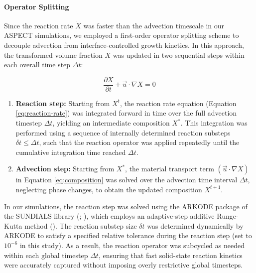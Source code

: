 \documentclass[
  paper=a4,
  ,captions=tableheading
]{scrartcl}
\providecommand{\tightlist}{%
  \setlength{\itemsep}{0pt}\setlength{\parskip}{0pt}}
\begin{document}
\paragraph{Operator Splitting}\label{sec:operator-splitting}

Since the reaction rate \(\dot{X}\) was faster than the advection
timescale in our ASPECT simulations, we employed a first-order operator
splitting scheme to decouple advection from interface-controlled growth
kinetics. In this approach, the transformed volume fraction \(X\) was
updated in two sequential steps within each overall time step
\(\Delta t\):

\begin{equation}
  \frac{\partial X}{\partial t} + \vec{u} \cdot \nabla X = 0
  \label{eq:composition}
\end{equation}

\begin{enumerate}
\def\labelenumi{\arabic{enumi}.}
\tightlist
\item
  \textbf{Reaction step:} Starting from \(X^{t}\), the reaction rate
  equation (Equation \ref{eq:reaction-rate}) was integrated forward in
  time over the full advection timestep \(\Delta t\), yielding an
  intermediate composition \(X^{\ast}\). This integration was performed
  using a sequence of internally determined reaction substeps
  \(\delta t \le \Delta t\), such that the reaction operator was applied
  repeatedly until the cumulative integration time reached \(\Delta t\).
\item
  \textbf{Advection step:} Starting from \(X^{\ast}\), the material
  transport term \(\left(\vec{u} \cdot \nabla X \right)\) in Equation
  \ref{eq:composition} was solved over the advection time interval
  \(\Delta t\), neglecting phase changes, to obtain the updated
  composition \(X^{t+1}\).
\end{enumerate}

In our simulations, the reaction step was solved using the ARKODE
package of the SUNDIALS library (; ),
which employs an adaptive-step additive Runge-Kutta method
(). The reaction
substep size \(\delta t\) was determined dynamically by ARKODE to
satisfy a specified relative tolerance during the reaction step (set to
\(10^{-6}\) in this study). As a result, the reaction operator was
subcycled as needed within each global timestep \(\Delta t\), ensuring
that fast solid-state reaction kinetics were accurately captured without
imposing overly restrictive global timesteps.
\end{document}
